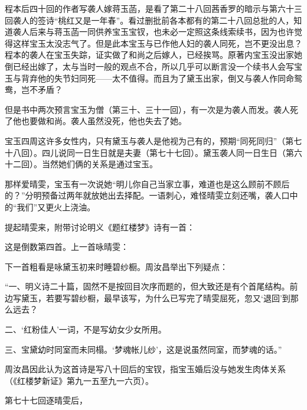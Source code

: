 \par 程本后四十回的作者写袭人嫁蒋玉菡，是看了第二十八回茜香罗的暗示与第六十三回袭人的签诗“桃红又是一年春”。看过删批前各本都有的第二十八回总批的人，知道袭人后来与蒋玉菡一同供养宝玉宝钗，也未必一定照这条线索续书，因为也许觉得这样宝玉太没志气了。但是此本宝玉与已作他人妇的袭人同死，岂不更没出息？程本的袭人在宝玉失踪，证实做了和尚之后嫁人，已经挨骂。原著内宝玉没出家她倒已经出嫁了，太与当时一般的观点不合，所以几乎可以断言没一个续书人会写宝玉与背弃他的失节妇同死——太不值得。而且为了黛玉出家，倒又与袭人作同命鸳鸯，岂不矛盾？
\par 但是书中两次预言宝玉为僧（第三十、三十一回），有一次是为袭人而发。袭人死了他也要做和尚。袭人虽然没死，他也失去了她。
\par 宝玉四周这许多女性内，只有黛玉与袭人是他视为己有的，预期“同死同归”（第七十八回）。四儿说同一日生日就是夫妻（第七十七回）。黛玉袭人同一日生日（第六十二回）。当然她们俩的关系是通过宝玉。
\par 那样爱晴雯，宝玉有一次说她“明儿你自己当家立事，难道也是这么顾前不顾后的？”分明预备过两年就放她出去择配。一语刺心，难怪晴雯立刻还嘴，袭人口中的“我们”又更火上浇油。
\par 提起晴雯来，附带讨论明义《题红楼梦》诗有一首：
\par 这是倒数第四首。上一首咏晴雯：
\par 下一首粗看是咏黛玉初来时睡碧纱橱。周汝昌举出下列疑点：
\par “一、明义诗二十篇，固然不是按回目次序而题的，但大致还是有个首尾结构。前边写黛玉，若要写碧纱橱，最早该写，为什么已写完了晴雯屈死，忽又‘退回’到那么远去？
\par 二、‘红粉佳人’一词，不是写幼女少女所用。
\par 三、宝黛幼时同室而未同榻。‘梦魂帐儿纱’，这是说虽然同室，而梦魂的话。”
\par 周汝昌因此认为这首诗是写八十回后的宝钗，指宝玉婚后没与她发生肉体关系（《红楼梦新证》第九一五至九一六页）。
\par 第七十七回逐晴雯后，

